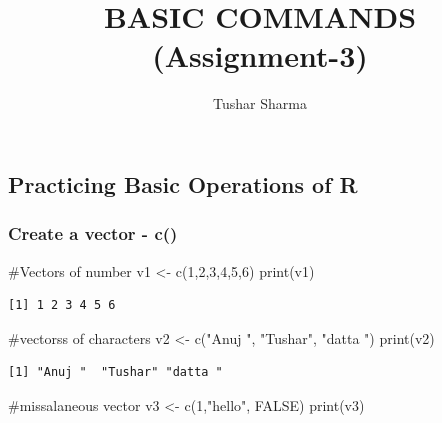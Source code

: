 \documentclass[
  letterpaper,
  DIV=11,
  numbers=noendperiod]{scrartcl}
\title{BASIC COMMANDS (Assignment-3)}
\author{Tushar Sharma}
\date{}
\newenvironment{Shaded}{\begin{snugshade}}{\end{snugshade}}
\newcommand{\CommentTok}[1]{\textcolor[rgb]{0.37,0.37,0.37}{#1}}
\newcommand{\ConstantTok}[1]{\textcolor[rgb]{0.56,0.35,0.01}{#1}}
\newcommand{\DecValTok}[1]{\textcolor[rgb]{0.68,0.00,0.00}{#1}}
\newcommand{\FunctionTok}[1]{\textcolor[rgb]{0.28,0.35,0.67}{#1}}
\newcommand{\NormalTok}[1]{\textcolor[rgb]{0.00,0.23,0.31}{#1}}
\newcommand{\OtherTok}[1]{\textcolor[rgb]{0.00,0.23,0.31}{#1}}
\newcommand{\StringTok}[1]{\textcolor[rgb]{0.13,0.47,0.30}{#1}}
\begin{document}
\maketitle


\subsection{Practicing Basic Operations of
R}\label{practicing-basic-operations-of-r}

\subsubsection{Create a vector - c()}\label{create-a-vector---c}

\begin{Shaded}
\begin{Highlighting}[]
\CommentTok{\#Vectors of number }
\NormalTok{v1 }\OtherTok{\textless{}{-}} \FunctionTok{c}\NormalTok{(}\DecValTok{1}\NormalTok{,}\DecValTok{2}\NormalTok{,}\DecValTok{3}\NormalTok{,}\DecValTok{4}\NormalTok{,}\DecValTok{5}\NormalTok{,}\DecValTok{6}\NormalTok{)}
\FunctionTok{print}\NormalTok{(v1)}
\end{Highlighting}
\end{Shaded}

\begin{verbatim}
[1] 1 2 3 4 5 6
\end{verbatim}

\begin{Shaded}
\begin{Highlighting}[]
\CommentTok{\#vectorss of characters}
\NormalTok{v2 }\OtherTok{\textless{}{-}} \FunctionTok{c}\NormalTok{(}\StringTok{"Anuj "}\NormalTok{, }\StringTok{"Tushar"}\NormalTok{, }\StringTok{"datta "}\NormalTok{)}
\FunctionTok{print}\NormalTok{(v2)}
\end{Highlighting}
\end{Shaded}

\begin{verbatim}
[1] "Anuj "  "Tushar" "datta "
\end{verbatim}

\begin{Shaded}
\begin{Highlighting}[]
\CommentTok{\#missalaneous vector}
\NormalTok{v3 }\OtherTok{\textless{}{-}} \FunctionTok{c}\NormalTok{(}\DecValTok{1}\NormalTok{,}\StringTok{"hello"}\NormalTok{, }\ConstantTok{FALSE}\NormalTok{)}
\FunctionTok{print}\NormalTok{(v3)}
\end{Highlighting}
\end{Shaded}
\end{document}
